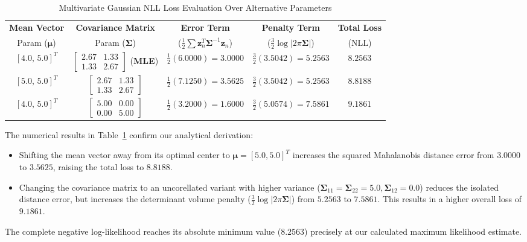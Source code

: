 \documentclass{article}
\begin{document}
\begin{table}[htbp]
\centering
\small
\setlength{\tabcolsep}{4pt}
\begin{tabular}{|c|c|c|c|c|}
\hline
\textbf{Mean Vector} & \textbf{Covariance Matrix} & \textbf{Error Term} & \textbf{Penalty Term} & \textbf{Total Loss} \\
Param ($\boldsymbol{\mu}$) & Param ($\boldsymbol{\Sigma}$) & ($\frac{1}{2}\sum \mathbf{z}_n^T \boldsymbol{\Sigma}^{-1} \mathbf{z}_n$) & ($\frac{3}{2}\log|2\pi\boldsymbol{\Sigma}|$) & ($\text{NLL}$) \\ \hline
$[4.0, \, 5.0]^T$ & $\begin{bmatrix} 2.67 & 1.33 \\ 1.33 & 2.67 \end{bmatrix}$ (\textbf{MLE}) & $\frac{1}{2}(6.0000) = 3.0000$ & $\frac{3}{2}(3.5042) = 5.2563$ & $\mathbf{8.2563}$ \\ \hline
$[5.0, \, 5.0]^T$ & $\begin{bmatrix} 2.67 & 1.33 \\ 1.33 & 2.67 \end{bmatrix}$ & $\frac{1}{2}(7.1250) = 3.5625$ & $\frac{3}{2}(3.5042) = 5.2563$ & $\mathbf{8.8188}$ \\ \hline
$[4.0, \, 5.0]^T$ & $\begin{bmatrix} 5.00 & 0.00 \\ 0.00 & 5.00 \end{bmatrix}$ & $\frac{1}{2}(3.2000) = 1.6000$ & $\frac{3}{2}(5.0574) = 7.5861$ & $\mathbf{9.1861}$ \\ \hline
\end{tabular}
\caption{Multivariate Gaussian NLL Loss Evaluation Over Alternative Parameters}
\label{tab:multivariate_loss}
\end{table}

The numerical results in Table~\ref{tab:multivariate_loss} confirm our analytical derivation:
\begin{itemize}
    \item Shifting the mean vector away from its optimal center to $\boldsymbol{\mu} = [5.0, 5.0]^T$ increases the squared Mahalanobis distance error from $3.0000$ to $3.5625$, raising the total loss to $8.8188$.
    \item Changing the covariance matrix to an uncorellated variant with higher variance ($\boldsymbol{\Sigma}_{11}=\boldsymbol{\Sigma}_{22}=5.0, \boldsymbol{\Sigma}_{12}=0.0$) reduces the isolated distance error, but increases the determinant volume penalty ($\frac{3}{2}\log|2\pi\boldsymbol{\Sigma}|$) from $5.2563$ to $7.5861$. This results in a higher overall loss of $9.1861$.
\end{itemize}
The complete negative log-likelihood reaches its absolute minimum value ($8.2563$) precisely at our calculated maximum likelihood estimate.
\end{document}
